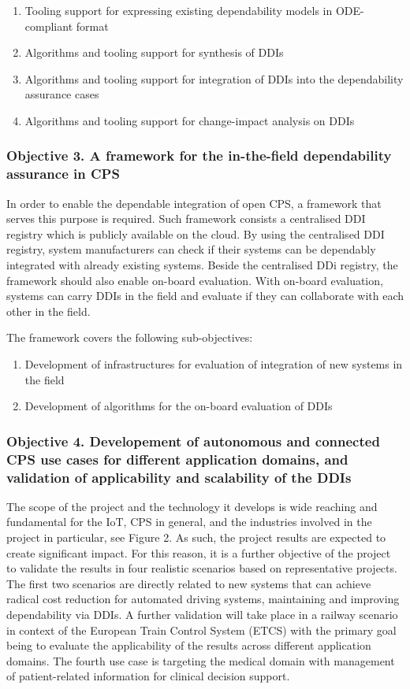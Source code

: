 \begin{enumerate}
	\item Tooling support for expressing existing dependability models in ODE-compliant format
	\item Algorithms and tooling support for synthesis of DDIs
	\item Algorithms and tooling support for integration of DDIs into the dependability assurance cases
	\item Algorithms and tooling support for change-impact analysis on DDIs
\end{enumerate}

\subsubsection{Objective 3. A framework for the in-the-field dependability assurance in CPS}
In order to enable the dependable integration of open CPS, a framework that serves this purpose is required. Such framework consists a centralised DDI registry which is publicly available on the cloud. By using the centralised DDI registry, system manufacturers can check if their systems can be dependably integrated with already existing systems. Beside the centralised DDi registry, the framework should also enable on-board evaluation. With on-board evaluation, systems can carry DDIs in the field and evaluate if they can collaborate with each other in the field.

The framework covers the following sub-objectives:

\begin{enumerate}
	\item Development of infrastructures for evaluation of integration of new systems in the field
	\item Development of algorithms for the on-board evaluation of DDIs
\end{enumerate}

\subsubsection{Objective 4. Developement of autonomous and connected CPS use cases for different application domains, and validation of applicability and scalability of the DDIs}
The scope of the project and the technology it develops is wide reaching and fundamental for the IoT, CPS in general, and the industries involved in the project in particular, see Figure 2. As such, the project results are expected to create significant impact. For this reason, it is a further objective of the project to validate the results in four realistic scenarios based on representative projects. The first two scenarios are directly related to new systems that can achieve radical cost reduction for automated driving systems, maintaining and improving dependability via DDIs. A further validation will take place in a railway scenario in context of the European Train Control System (ETCS) with the primary goal being to evaluate the applicability of the results across different application domains. The fourth use case is targeting the medical domain with management of patient-related information for clinical decision support.

